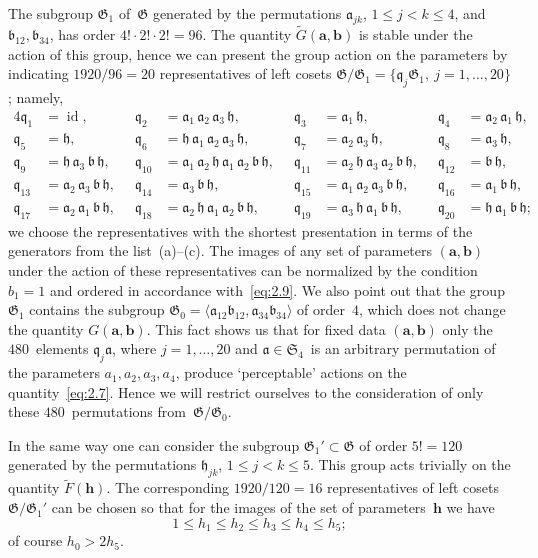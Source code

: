 \documentclass[a4paper,twoside]{article}
\numberwithin{equation}{section}
\renewcommand{\[}{\lfloor}
\renewcommand{\]}{\rfloor}
\newcommand{\<}{\langle}
\renewcommand{\>}{\rangle}
\newcommand{\wt}{\widetilde}
\DeclareMathOperator{\id}{id}
\newcommand{\ba}{\boldsymbol a}
\newcommand{\bb}{\boldsymbol b}
\newcommand{\bh}{\boldsymbol h}
\newcommand{\fa}{\mathfrak a}
\newcommand{\fb}{\mathfrak b}
\newcommand{\fh}{\mathfrak h}
\newcommand{\fq}{\mathfrak q}
\newcommand{\fS}{\mathfrak S}
\newcommand{\fG}{\mathfrak G}
\begin{document}
The subgroup $\fG_1$ of~$\fG$ generated by the permutations
$\fa_{jk}$, $1\le j<k\le4$, and $\fb_{12},\fb_{34}$,
has order $4!\cdot2!\cdot2!=96$. The quantity $\wt G(\ba,\bb)$
is stable under the action of this group, hence we can present
the group action on the parameters by indicating
$1920/96=20$ representatives of left cosets
$\fG/\fG_1=\{\fq_j\fG_1,\ j=1,\dots,20\}$;
namely,
\begin{alignat*}{4}
\fq_1&=\id,
\;\;&
\fq_2&=\fa_1\,\fa_2\,\fa_3\,\fh,
\;\;&
\fq_3&=\fa_1\,\fh,
\;\;&
\fq_4&=\fa_2\,\fa_1\,\fh,
\\
\fq_5&=\fh,
\;\;&
\fq_6&=\fh\,\fa_1\,\fa_2\,\fa_3\,\fh,
\;\;&
\fq_7&=\fa_2\,\fa_3\,\fh,
\;\;&
\fq_8&=\fa_3\,\fh,
\\
\fq_9&=\fh\,\fa_3\,\fb\,\fh,
\;\;&
\fq_{10}&=\fa_1\,\fa_2\,\fh\,\fa_1\,\fa_2\,\fb\,\fh,
\;\;&
\fq_{11}&=\fa_2\,\fh\,\fa_3\,\fa_2\,\fb\,\fh,
\;\;&
\fq_{12}&=\fb\,\fh,
\\
\fq_{13}&=\fa_2\,\fa_3\,\fb\,\fh,
\;\;&
\fq_{14}&=\fa_3\,\fb\,\fh,
\;\;&
\fq_{15}&=\fa_1\,\fa_2\,\fa_3\,\fb\,\fh,
\;\;&
\fq_{16}&=\fa_1\,\fb\,\fh,
\\
\fq_{17}&=\fa_2\,\fa_1\,\fb\,\fh,
\;\;&
\fq_{18}&=\fa_2\,\fh\,\fa_1\,\fa_2\,\fb\,\fh,
\;\;&
\fq_{19}&=\fa_3\,\fh\,\fa_1\,\fb\,\fh,
\;\;&
\fq_{20}&=\fh\,\fa_1\,\fb\,\fh;
\end{alignat*}
we choose the representatives with the shortest presentation
in terms of the generators from the list~(a)--(c).
The images of any set of parameters $(\ba,\bb)$
under the action of these representatives
can be normalized by the condition
$b_1=1$ and ordered in accordance with~\eqref{eq:2.9}.
We also point out that the group~$\fG_1$ contains the subgroup
$\fG_0=\<\fa_{12}\fb_{12},\fa_{34}\fb_{34}\>$
of order~$4$, which does not change the quantity
$G(\ba,\bb)$. This fact shows us that for fixed data
$(\ba,\bb)$ only the $480$~elements
$\fq_j\fa$, where $j=1,\dots,20$ and $\fa\in\fS_4$~is an arbitrary
permutation of the parameters $a_1,a_2,a_3,a_4$,
produce `perceptable' actions on the quantity~\eqref{eq:2.7}.
Hence we will restrict ourselves to the consideration of only these
$480$~permutations from~$\fG/\fG_0$.

In the same way one can consider the subgroup
$\fG_1'\subset\fG$ of order $5!=120$ generated by the permutations
$\fh_{jk}$, $1\le j<k\le5$. This group acts trivially
on the quantity $\wt F(\bh)$. The corresponding
$1920/120=16$ representatives of left cosets $\fG/\fG_1'$
can be chosen so that for the images of the set of parameters~$\bh$
we have
$$
1\le h_1\le h_2\le h_3\le h_4\le h_5;
$$
of course $h_0>2h_5$.
\end{document}

